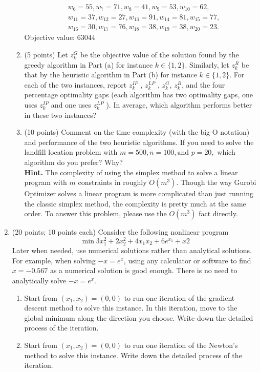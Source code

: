 \documentclass[12pt]{article}
\begin{document}
\begin{enumerate}
\begin{enumerate}
\begin{align*}
                              &w_{6} = 55, w_{7} = 71, w_{8} = 41, w_{9} = 53, w_{10} = 62,\\
                              &w_{11} = 37, w_{12} = 27, w_{13} = 91, w_{14} = 81, w_{15} = 77,\\
                              &w_{16} = 30, w_{17} = 76, w_{18} = 38, w_{19} = 38, w_{20} = 23.
                        \end{align*}
                        Objective value:  $63044$
                  \item (5 points) Let $z_k^G$ be the objective value of the solution found by the greedy algorithm in Part (a) for instance $k \in \{1,2\}$. Similarly, let $z_k^R$ be that by the heuristic algorithm in Part (b) for instance $k \in \{1, 2\}$. For each of the two instances, report $z_k^{IP}$ , $z_k^{LP}$ , $z_k^G$, $z_k^R$, and the four percentage optimality gaps (each algorithm has two optimality gaps, one uses $z_k^{IP}$ and one uses $z_k^{LP}$ ). In average, which algorithm performs better in these two instances?
                  \item (10 points) Comment on the time complexity (with the big-O notation) and performance of the two heuristic algorithms. If you need to solve the landfill location problem with $m = 500, n = 100, \text{and } p = 20,$ which algorithm do you prefer? Why?\\
                        \textbf{Hint.} The complexity of using the simplex method to solve a linear program with $m$ constraints in roughly $O(m^3).$ Though the way Gurobi Optimizer solves a linear program is more complicated than just running the classic simplex method, the complexity is pretty much at the same order. To answer this problem, please use the $O(m^3)$ fact directly.
            \end{enumerate}
      \item (20 points; 10 points each) Consider the following nonlinear program
            \begin{equation*}
                  \min 3x_1^2 + 2x_2^2 + 4x_1x_2 +6e^{x_1}+x2
            \end{equation*}
            Later when needed, use numerical solutions rather than analytical solutions. For example, when solving $-x = e^x$, using any calculator or software to find $x = -0.567$ as a numerical solution is good enough. There is no need to analytically solve $-x = e^x$.
            \begin{enumerate}
                  \item Start from $(x_1,x_2) = (0,0)$ to run one iteration of the gradient descent method to solve this instance. In this iteration, move to the global minimum along the direction you choose. Write down the detailed process of the iteration.
                  \item Start from $(x_1, x_2) = (0, 0)$ to run one iteration of the Newton’s method to solve this instance. Write down the detailed process of the iteration.
            \end{enumerate}
\end{enumerate}
\end{document}
